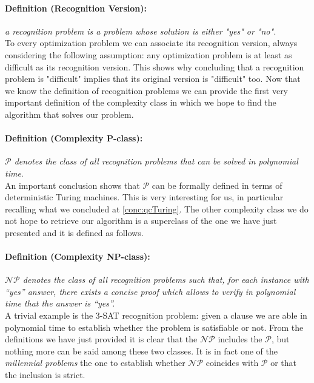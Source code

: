 \documentclass[english]{article}
\begin{document}
			\paragraph{Definition (Recognition Version):} \emph{a recognition problem is a problem whose solution is either "yes" or "no".} \\
			
			To every optimization problem we can associate its recognition version, always considering the following assumption: any optimization problem is at least as difficult as its recognition version. This shows why concluding that a recognition problem is "difficult" implies that its original version is "difficult" too. Now that we know the definition of recognition problems we can provide the first very important definition of the complexity class in which we hope to find the algorithm that solves our problem.
			
			\paragraph{Definition (Complexity P-class):} \emph{$\mathcal{P}$ denotes the class of all recognition problems that can be solved in polynomial time}. \\
			
			An important conclusion shows that $\mathcal{P}$ can be formally defined in terms of deterministic Turing machines. This is very interesting for us, in particular recalling what we concluded at \ref{conc:qcTuring}. The other complexity class we do not hope to retrieve our algorithm is a superclass of the one we have just presented and it is defined as follows.
			
			\paragraph{Definition (Complexity NP-class):} \emph{$\mathcal{N}\mathcal{P}$ denotes the class of all recognition problems such that, for each instance with “yes” answer, there exists a concise proof which allows to verify in polynomial time that the answer is “yes”.} \\
		
			A trivial example is the 3-SAT recognition problem: given a clause we are able in polynomial time to establish whether the problem is satisfiable or not. From the definitions we have just provided it is clear that the $\mathcal{N}\mathcal{P}$ includes the $\mathcal{P}$, but nothing more can be said among these two classes. It is in fact one of the \emph{millennial problems} the one to establish whether $\mathcal{N}\mathcal{P}$ coincides with $\mathcal{P}$ or that the inclusion is strict. \\
			
\end{document}
